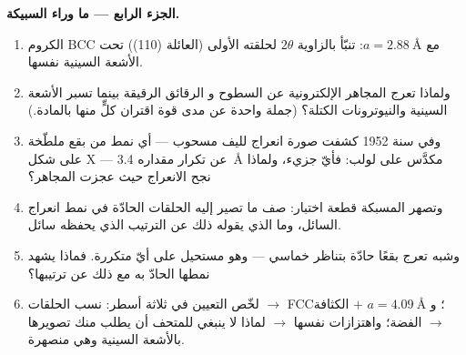 \begin{problem}
\medskip\noindent\textbf{الجزء الرابع --- ما وراء السبيكة.}

\begin{enumerate}[resume]
  \item الكروم BCC مع $a = \qty{2.88}{\angstrom}$: تنبّأ
        بالزاوية $2\theta$ لحلقته الأولى (العائلة (110)) تحت
        الأشعة السينية نفسها.
  \item ولماذا تعرج المجاهر الإلكترونية عن السطوح و
        الرقائق الرقيقة بينما تسبر الأشعة السينية والنيوترونات الكتلة؟ (جملة
        واحدة عن مدى قوة اقتران كلٍّ منها بالمادة.)
  \item وفي سنة 1952 كشفت صورة انعراج لليف مسحوب --- أي
        نمط من بقع ملطّخة على شكل X --- عن تكرار مقداره
        \qty{3.4}{\angstrom} مكدَّس على لولب: فأيّ جزيء،
        ولماذا نجح الانعراج حيث عجزت المجاهر؟
  \item وتصهر المسبكة قطعة اختبار: صف ما تصير إليه الحلقات
        الحادّة في نمط انعراج السائل، وما الذي
        يقوله ذلك عن الترتيب الذي يحفظه سائل.
  \item وشبه  تعرج بقعًا حادّة بتناظر
        خماسي --- وهو مستحيل على أيّ  متكررة. فماذا
        يشهد نمطها الحادّ به مع ذلك عن ترتيبها؟
  \item لخّص التعيين في ثلاثة أسطر: نسب الحلقات
        $\to$ FCC؛ و $a = \qty{4.09}{\angstrom}$ $+$ الكثافة $\to$
        الفضة؛ واهتزازات  نفسها $\to$ لماذا لا ينبغي
        للمتحف أن يطلب منك تصويرها بالأشعة السينية وهي منصهرة.
\end{enumerate}
\end{problem}
